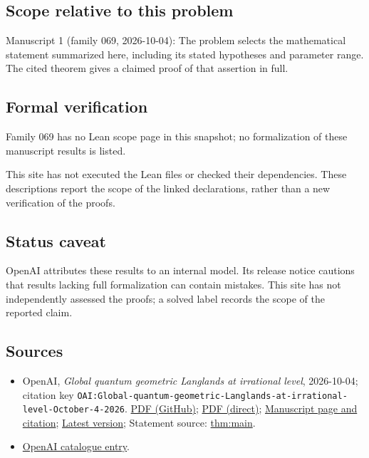 \documentclass[11pt]{article}
\begin{document}
\subsection{Scope relative to this problem}
Manuscript 1 (family 069, 2026-10-04): The problem selects the mathematical statement summarized here, including its stated hypotheses and parameter range. The cited theorem gives a claimed proof of that assertion in full.

\subsection{Formal verification}
Family 069 has no Lean scope page in this snapshot; no formalization of these manuscript results is listed.

This site has not executed the Lean files or checked their dependencies. These descriptions report the scope of the linked declarations, rather than a new verification of the proofs.

\subsection{Status caveat}
OpenAI attributes these results to an internal model. Its release notice cautions that results lacking full formalization can contain mistakes. This site has not independently assessed the proofs; a solved label records the scope of the reported claim.

\subsection{Sources}
\begin{itemize}
\item OpenAI, \emph{Global quantum geometric Langlands at irrational level}, 2026-10-04; citation key \texttt{OAI:Global-quantum-geometric-Langlands-at-irrational-level-October-4-2026}. \href{https://github.com/openai/math/blob/adc7f1241b42e322a6451854ab7e4b4c146bf78a/preprints/Global-quantum-geometric-Langlands-at-irrational-level-October-4-2026/quantum-langlands.pdf}{PDF (GitHub)}; \href{https://github.com/openai/math/raw/adc7f1241b42e322a6451854ab7e4b4c146bf78a/preprints/Global-quantum-geometric-Langlands-at-irrational-level-October-4-2026/quantum-langlands.pdf}{PDF (direct)}; \href{https://github.com/openai/math/blob/adc7f1241b42e322a6451854ab7e4b4c146bf78a/preprints/Global-quantum-geometric-Langlands-at-irrational-level-October-4-2026/README.md}{Manuscript page and citation}; \href{https://github.com/openai/math/blob/main/preprints/Global-quantum-geometric-Langlands-at-irrational-level-October-4-2026/quantum-langlands.pdf}{Latest version}; Statement source: \href{https://github.com/openai/math/blob/adc7f1241b42e322a6451854ab7e4b4c146bf78a/preprints/Global-quantum-geometric-Langlands-at-irrational-level-October-4-2026/build/sections/01-introduction.tex\#L28}{thm:main}.
\item \href{https://github.com/openai/math/blob/adc7f1241b42e322a6451854ab7e4b4c146bf78a/CONTENTS.md}{OpenAI catalogue entry}.
\end{itemize}
\end{document}
